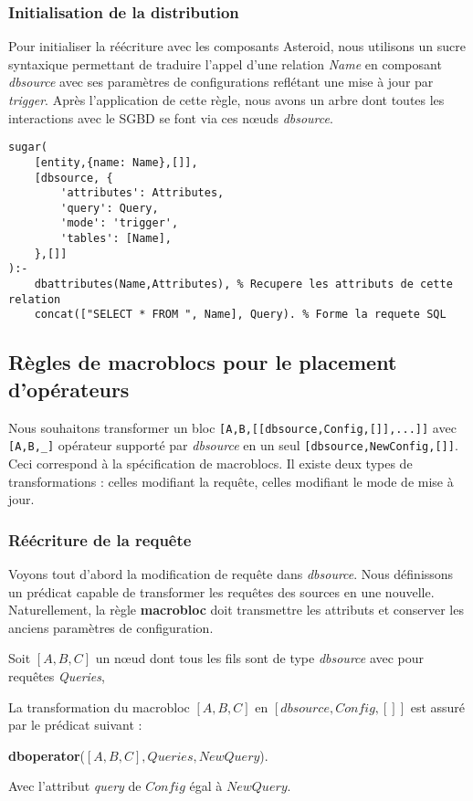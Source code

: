 \subsubsection{Initialisation de la distribution}
Pour initialiser la réécriture avec les composants Asteroid, nous utilisons un sucre syntaxique permettant de traduire l'appel d'une relation \textit{Name} en composant \textit{dbsource} avec ses paramètres de configurations reflétant une mise à jour par \textit{trigger}. Après l'application de cette règle, nous avons un arbre dont toutes les interactions avec le SGBD se font via ces nœuds \textit{dbsource}.
\begin{lstlisting}
sugar(
    [entity,{name: Name},[]],
    [dbsource, {
        'attributes': Attributes,
        'query': Query,
        'mode': 'trigger', 
        'tables': [Name],
    },[]]
):-
    dbattributes(Name,Attributes), % Recupere les attributs de cette relation
    concat(["SELECT * FROM ", Name], Query). % Forme la requete SQL
\end{lstlisting}

\subsection{Règles de macroblocs pour le placement d'opérateurs}
Nous souhaitons transformer un bloc \lstinline|[A,B,[[dbsource,Config,[]],...]]| avec \lstinline|[A,B,_]| opérateur supporté par \textit{dbsource} en un seul \lstinline|[dbsource,NewConfig,[]]|. Ceci correspond à la spécification de macroblocs. Il existe deux types de transformations : celles modifiant la requête, celles modifiant le mode de mise à jour.

\subsubsection{Réécriture de la requête}
Voyons tout d'abord la modification de requête dans \textit{dbsource}. Nous définissons un prédicat capable de transformer les requêtes des sources en une nouvelle. Naturellement, la règle \textbf{macrobloc} doit transmettre les attributs et conserver les anciens paramètres de configuration.
\begin{regle}
    Soit $[A,B,C]$ un nœud dont tous les fils sont de type \textit{dbsource} avec pour requêtes \textit{Queries},

    La transformation du macrobloc $[A,B,C]$ en $[dbsource,Config,[]]$ est assuré par le prédicat suivant :
    \begin{center} \textbf{dboperator}($[A,B,C], Queries, NewQuery$). \end{center}
    Avec l'attribut \textit{query} de $Config$ égal à $NewQuery$.
\end{regle}

